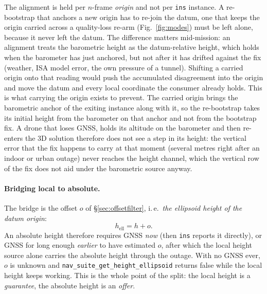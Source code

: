\documentclass[11pt,a4paper]{article}
\newcommand{\code}[1]{\texttt{#1}}
\begin{document}
The alignment is held per $n$-frame \emph{origin} and not per \code{ins} instance.
A re-bootstrap that anchors a new origin has to re-join the datum, one that
keeps the origin carried across a quality-loss re-arm (Fig.~\ref{fig:modes})
must be left alone, because it never left the datum. The difference matters
mid-mission: an alignment treats the barometric height as the datum-relative
height, which holds when the barometer has just anchored, but not after it has
drifted against the fix (weather, ISA model error, the own pressure of a
tunnel). Shifting a carried origin onto that reading would push the accumulated
disagreement into the origin and move the datum and every local coordinate the
consumer already holds. This is what carrying the origin exists to prevent.
The carried origin brings the barometric anchor of the exiting instance along
with it, so the re-bootstrap takes its initial height from the barometer on that
anchor and not from the bootstrap fix. A drone that loses GNSS, holds its
altitude on the barometer and then re-enters the 3D solution therefore does
not see a step in its height: the vertical error that the fix happens to carry
at that moment (several metres right after an indoor or urban outage) never
reaches the height channel, which the vertical row of the fix does not aid under
the barometric source anyway.
\paragraph{Bridging local to absolute.} The bridge is the offset $o$
of \S\ref{sec:offsetfilter}, i.\,e.\ \emph{the ellipsoid height of the
datum origin}:
\begin{equation}
  h_{\text{ell}} = h + o .
  \label{eq:hell}
\end{equation}
An absolute height therefore requires GNSS \emph{now} (then \code{ins}
reports it directly), or GNSS for long enough \emph{earlier} to have
estimated $o$, after which the local height source alone carries the
absolute height through the outage. With no GNSS ever, $o$ is unknown
and \code{nav\_\allowbreak{}suite\_\allowbreak{}get\_\allowbreak{}height\_\allowbreak{}ellipsoid} returns false while the
local height keeps working. This is the whole point of the split: the
local height is a \emph{guarantee}, the absolute height is an
\emph{offer}.
\end{document}
